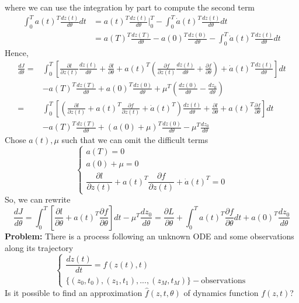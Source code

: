 \documentclass{article}
\theoremstyle{theorem}
\theoremstyle{definition}
\begin{document}
	where we can use the integration by part to compute the second term
	$$\begin{aligned}\int_{0}^{T} a(t)^T\frac{d \dot{z}(t)}{d\theta}dt &= a(t)^T\frac{d z(t)}{d\theta} \Big| _{0}^{T}-\int_{0}^{T} \dot{a}(t)^T\frac{d z(t)}{d\theta}dt \\ &= a(T)^T\frac{d z(T)}{d\theta}-a(0)^T\frac{d z(0)}{d\theta} -\int_{0}^{T} \dot{a}(t)^T\frac{d z(t)}{d\theta}dt  \end{aligned}$$
	Hence,
	$$\begin{aligned}	
		\frac{dJ}{d\theta}=& \int_{0}^{T} \left[\frac{\partial l}{\partial z(t)} \frac{dz(t)}{d \theta} +  \frac{\partial l}{ \partial \theta} +a(t)^T \left(\frac{\partial f}{\partial z(t)} \frac{dz(t)}{d \theta} + \frac{\partial f}{ \partial \theta}\right)+ \dot{a}(t)^T\frac{d z(t)}{d\theta}\right]dt \\ &-a(T)^T\frac{d z(T)}{d\theta}+a(0)^T\frac{d z(0)}{d\theta}+\mu^T \left( \frac{dz(0)}{d\theta} -\frac{dz_0}{d\theta} \right) \\ =& \int_{0}^{T} \left[ \left( \frac{\partial l}{\partial z(t)}+a(t)^T \frac{\partial f}{\partial z(t)}+ \dot{a}(t)^T \right)\frac{dz(t)}{d \theta} +  \frac{\partial l}{ \partial \theta}  +a(t)^T \frac{\partial f}{ \partial \theta}\right]dt\\ &-a(T)^T\frac{d z(T)}{d\theta}+\left(a(0)+\mu\right)^T\frac{d z(0)}{d\theta}-\mu^T\frac{dz_0}{d\theta}   \end{aligned} $$
	Chose $a(t), \mu$ such that we can omit the difficult terms
	$$\left\{\begin{matrix}
	a(T)=0	\\ 
		a(0) + \mu=0 \\
		\dfrac{\partial l}{\partial z(t)}+a(t)^T \dfrac{\partial f}{\partial z(t)}+ \dot{a}(t)^T=0
	\end{matrix}\right.$$
So, we can rewrite
$$\frac{dJ}{d\theta}=\int_{0}^{T} \left[  \frac{\partial l}{ \partial \theta}  +a(t)^T \frac{\partial f}{ \partial \theta}\right]dt-\mu^T\frac{dz_0}{d\theta}=\frac{\partial L}{ \partial \theta}  +\int_{0}^{T}  a(t)^T \frac{\partial f}{ \partial \theta}dt+a(0)^T\frac{dz_0}{d\theta}  $$
\textbf{Problem:} There is a process following an unknown ODE and some observations along its trajectory
$$\left\{\begin{matrix}\dfrac{dz(t)}{dt} = f(z(t), t)  \\ \{(z_0, t_0),(z_1, t_1),...,(z_M, t_M)\} - \text{observations}\end{matrix}\right.$$
Is it possible to find an approximation $\widehat{f}(z, t, \theta)$ of dynamics function $f(z, t)$?
\end{document}
